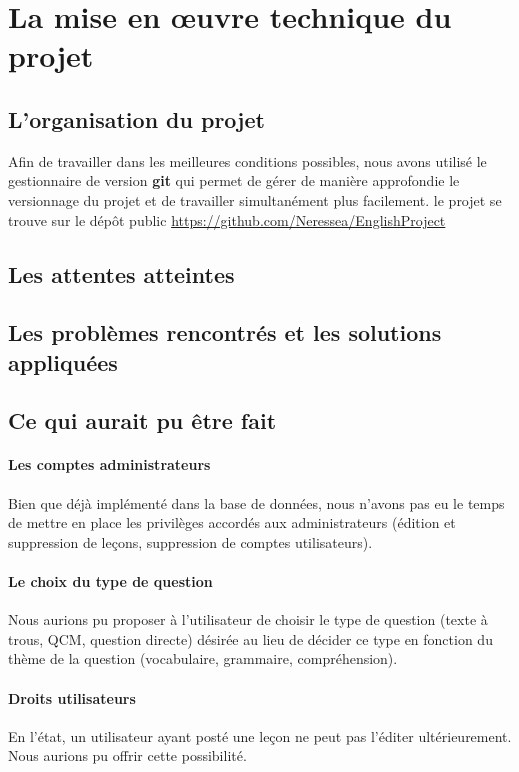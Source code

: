\section{La mise en œuvre technique du projet}

\subsection{L'organisation du projet}

Afin de travailler dans les meilleures conditions possibles, nous avons utilisé le gestionnaire de version \textbf{git} qui permet de gérer de manière approfondie le versionnage du projet et de travailler simultanément plus facilement. le projet se trouve sur le dépôt public \url{https://github.com/Neressea/EnglishProject}

\subsection{Les attentes atteintes}


\subsection{Les problèmes rencontrés et les solutions appliquées}

	
\subsection{Ce qui aurait pu être fait}
\paragraph{Les comptes administrateurs}
Bien que déjà implémenté dans la base de données, nous n'avons pas eu le temps de mettre en place les privilèges accordés aux administrateurs (édition et suppression de leçons, suppression de comptes utilisateurs).

\paragraph{Le choix du type de question}
Nous aurions pu proposer à l'utilisateur de choisir le type de question (texte à trous, QCM, question directe) désirée au lieu de décider ce type en fonction du thème de la question (vocabulaire, grammaire, compréhension).

\paragraph{Droits utilisateurs}
En l'état, un utilisateur ayant posté une leçon ne peut pas l'éditer ultérieurement. Nous aurions pu offrir cette possibilité.

